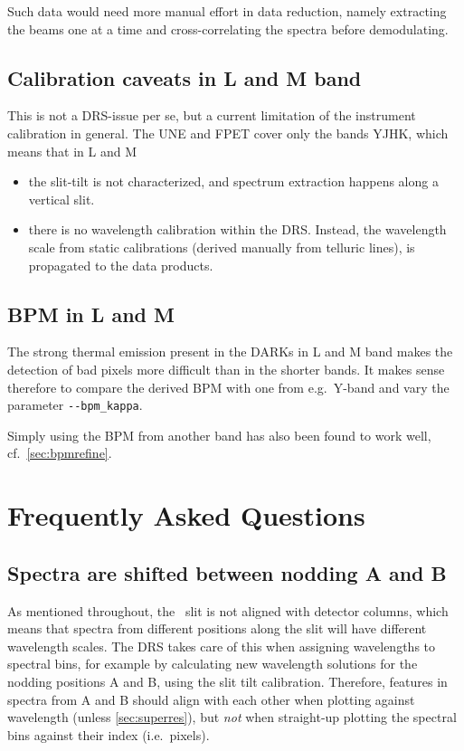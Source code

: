 Such data would need more manual effort in data reduction, namely extracting the
beams one at a time and cross-correlating the spectra before demodulating.


\subsection{Calibration caveats in L and M band}

This is not a DRS-issue per se, but a current limitation of the instrument
calibration in general. The UNE and FPET cover only the bands YJHK, which means
that in L and M
\begin{itemize}
    \item the slit-tilt is not characterized, and spectrum extraction happens
    along a vertical slit.
    \item there is no wavelength calibration within the DRS. Instead, the
    wavelength scale from static calibrations (derived manually from telluric
    lines), is propagated to the data products.
\end{itemize}


\subsection{BPM in L and M}

The strong thermal emission present in the DARKs in L and M band makes the
detection of bad pixels more difficult than in the shorter bands. It makes sense
therefore to compare the derived BPM with one from e.g.~Y-band and vary the
parameter \verb!--bpm_kappa!.

Simply using the BPM from another band has also been found to work well,
cf.~\ref*{sec:bpmrefine}.


\section{Frequently Asked Questions}

\subsection{Spectra are shifted between nodding A and B}
\label{faq:tilt}

As mentioned throughout, the \instrument\ slit is not aligned with detector
columns, which means that spectra from different positions along the slit will
have different wavelength scales. The DRS takes care of this when assigning
wavelengths to spectral bins, for example by calculating new wavelength
solutions for the nodding positions A and B, using the slit tilt calibration.
Therefore, features in spectra from A and B should align with each other when
plotting against wavelength (unless \ref{sec:superres}), but \emph{not} when
straight-up plotting the spectral bins against their index (i.e.~pixels).

